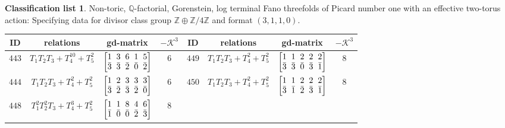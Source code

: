 \documentclass[pdftex]{sigma}%
\theoremstyle{definition}
\newtheorem{class-list}[thm]{Classification list}
\def\ZZ{{\mathbb Z}}
\def\QQ{{\mathbb Q}}
\numberwithin{equation}{section}
\begin{document}
\begin{class-list}
Non-toric, $\QQ$-factorial, Gorenstein, log terminal Fano
threefolds of Picard number one with an effective two-torus action:
Specifying data for divisor class group $\ZZ\oplus \ZZ/4\ZZ$ and
format $(3,1,1,0)$.
\begin{table}[h!]\centering\setlength{\tabcolsep}{3.5pt}
\renewcommand{\arraystretch}{1.15}\small\tabulinesep=1mm
\begin{tabu}{c|c|c|c||c|c|c|c}
\hline
ID&relations&gd-matrix&$-\mathcal{K}^3$&ID&relations&gd-matrix&$-\mathcal{K}^3$
\\
\hline
${443}$&${T_{1}T_{2}T_{3}+T_{4}^{10}+T_{5}^{2}}$
&$\arraycolsep=1mm\begin{bmatrix}{1} & {3} & {6} & {1} & {5} \\ {\bar{3}} & {\bar{3}} & {\bar{2}} & {\bar{0}} & {\bar{2}}\end{bmatrix}$&${6}$
&${449}$&${T_{1}T_{2}T_{3}+T_{4}^{2}+T_{5}^{2}}$
&$\arraycolsep=1mm\begin{bmatrix}{1} & {1} & {2} & {2} & {2} \\ {\bar{3}} & {\bar{3}} & {\bar{0}} & {\bar{3}} & {\bar{1}}\end{bmatrix}$&${8}$
\\
\hline
${444}$&${T_{1}T_{2}T_{3}+T_{4}^{2}+T_{5}^{2}}$
&$\arraycolsep=1mm\begin{bmatrix}{1} & {2} & {3} & {3} & {3} \\ {\bar{3}} & {\bar{2}} & {\bar{3}} & {\bar{2}} & {\bar{0}}\end{bmatrix}$&${6}$
&${450}$&${T_{1}T_{2}T_{3}+T_{4}^{2}+T_{5}^{2}}$
&$\arraycolsep=1mm\begin{bmatrix}{1} & {1} & {2} & {2} & {2} \\ {\bar{3}} & {\bar{1}} & {\bar{2}} & {\bar{3}} & {\bar{1}}\end{bmatrix}$&${8}$
\\
\hline
${448}$&${T_{1}^{2}T_{2}^{2}T_{3}+T_{4}^{3}+T_{5}^{2}}$
&$\arraycolsep=1mm\begin{bmatrix}{1} & {1} & {8} & {4} & {6} \\ {\bar{1}} & {\bar{0}} & {\bar{0}} & {\bar{2}} & {\bar{3}}\end{bmatrix}$&${8}$
\\
\end{tabu}%
\end{table}
\end{class-list}
\end{document}
